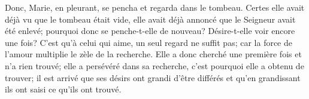 Donc, Marie, en pleurant, se pencha et regarda dans le tombeau.
Certes elle avait déjà vu que le tombeau était vide,
	elle avait déjà annoncé que le Seigneur avait été enlevé;
	pourquoi donc se penche-t-elle de nouveau?
	Désire-t-elle voir encore une fois?
C’est qu’à celui qui aime, un seul regard ne suffit pas;
	car la force de l’amour multiplie le zèle de la recherche.
Elle a donc cherché une première fois et n’a rien trouvé;
	elle a persévéré dans sa recherche,
	c’est pourquoi elle a obtenu de trouver;
	il est arrivé que ses désirs ont grandi d’être différés
	et qu’en grandissant ils ont saisi ce qu’ils ont trouvé.
